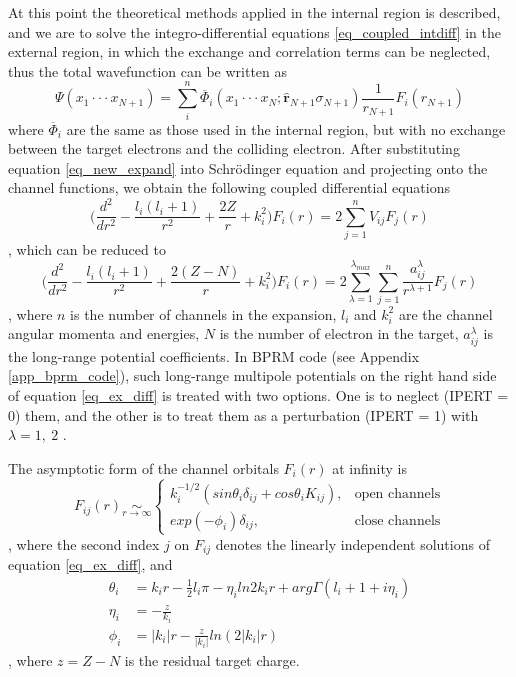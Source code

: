 At this point the theoretical methods applied in the internal region is described, and we are to solve the integro-differential equations \ref{eq_coupled_intdiff} in the external region, in which the exchange and correlation terms can be neglected, thus the total wavefunction can be written as 
\begin{equation} \label{eq_new_expand}
	\Psi(x_1\cdot\cdot\cdot x_{N+1}) = \sum_{i}^{n}\overline{\Phi}_i(x_1\cdot\cdot\cdot x_{N}; \hat{\textbf{r}}_{N+1}\sigma_{N+1}) \frac{1}{r_{N+1}} F_{i}(r_{N+1}) 
\end{equation}
where $\overline{\Phi}_i$ are the same as those used in the internal region, but with no exchange between the target electrons and the colliding electron. After substituting equation \ref{eq_new_expand} into Schr\"odinger equation and projecting onto the channel functions, we obtain the following coupled differential equations
\begin{equation}
\Bigg(\frac{d^2}{dr^2} - \frac{l_i(l_i+1)}{r^2} +\frac{2Z}{r} + k_{i}^2\Bigg) F_{i}(r) = 2\sum_{j=1}^n V_{ij} F_j(r)
\end{equation}
, which can be reduced to
\begin{equation}\label{eq_ex_diff}
	\Bigg(\frac{d^2}{dr^2} - \frac{l_i(l_i+1)}{r^2} +\frac{2(Z-N)}{r} + k_{i}^2\Bigg) F_{i}(r) = 2\sum_{\lambda=1}^{\lambda_{max}} \sum_{j=1}^{n} \frac{a_{ij}^\lambda}{r^{\lambda+1}} F_j(r) 
\end{equation}
, where $n$ is the number of channels in the expansion, $l_i$ and $k_i^2$ are the channel angular momenta and energies, $N$ is the number of electron in the target, $a_{ij}^\lambda$ is the long-range potential coefficients. In BPRM code (see Appendix \ref{app_bprm_code}), such long-range multipole potentials on the right hand side of equation \ref{eq_ex_diff} is treated with two options. One is to neglect (IPERT = 0) them, and the other is to treat them as a perturbation (IPERT = 1) with $\lambda = 1,~2$ \citep{opcd_2}.

The asymptotic form of the channel orbitals $F_i(r)$ at infinity is
\begin{equation} \label{eq_f_asymptotic}
	F_{ij}(r) \underset{r \to \infty}{\sim}
	\begin{cases}
		k_i^{-1/2}(sin\theta_i\delta_{ij}+cos\theta_iK_{ij}), & \text{open~channels} \\
		exp(-\phi_i)\delta_{ij}, & \text{close~channels}
	\end{cases}
\end{equation}
, where the second index $j$ on $F_{ij}$ denotes the linearly independent solutions of equation \ref{eq_ex_diff}, and 
\begin{align}
	\theta_i &= k_ir-\frac{1}{2}l_i\pi-\eta_iln2k_ir+arg\Gamma (l_i+1+i\eta _i) \label{eq_theta}\\
	\eta_i &= -\frac{z}{k_i} \\
	\phi_i &= |k_i|r - \frac{z}{|k_i|}ln (2|k_i|r) \label{eq_phi}
\end{align}
, where $z=Z-N$ is the residual target charge.

